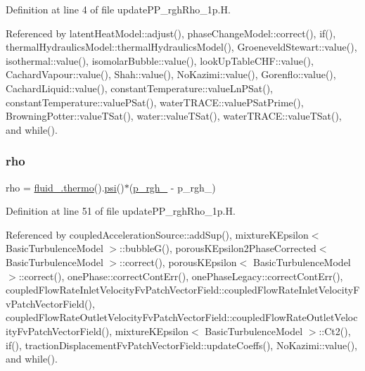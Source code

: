 Definition at line 4 of file update\+P\+P\+\_\+rgh\+Rho\+\_\+1p.\+H.



Referenced by latent\+Heat\+Model\+::adjust(), phase\+Change\+Model\+::correct(), if(), thermal\+Hydraulics\+Model\+::thermal\+Hydraulics\+Model(), Groeneveld\+Stewart\+::value(), isothermal\+::value(), isomolar\+Bubble\+::value(), look\+Up\+Table\+C\+H\+F\+::value(), Cachard\+Vapour\+::value(), Shah\+::value(), No\+Kazimi\+::value(), Gorenflo\+::value(), Cachard\+Liquid\+::value(), constant\+Temperature\+::value\+Ln\+P\+Sat(), constant\+Temperature\+::value\+P\+Sat(), water\+T\+R\+A\+C\+E\+::value\+P\+Sat\+Prime(), Browning\+Potter\+::value\+T\+Sat(), water\+::value\+T\+Sat(), water\+T\+R\+A\+C\+E\+::value\+T\+Sat(), and while().

\mbox{\label{updatePP__rghRho__1p_8H_ab8ec92cc3ea8422c9349409bae98d2a0}} 
\subsubsection{\texorpdfstring{rho}{rho}}
{\footnotesize\ttfamily rho = \hyperlink{EEqns__2p_8H_a9d615e711281a88a96c648787c7dbd32}{fluid\+\_\+.\+thermo}().\hyperlink{UEqn__1pl_8H_a165a34deec3ee505598e511a88831968}{psi}()$\ast$(\hyperlink{updatePP__rghRho__2p_8H_a320090d1a3c1675778a59e981765c77c}{p\+\_\+rgh\+\_\+} -\/ p\+\_\+rgh\+\_)}



Definition at line 51 of file update\+P\+P\+\_\+rgh\+Rho\+\_\+1p.\+H.



Referenced by coupled\+Acceleration\+Source\+::add\+Sup(), mixture\+K\+Epsilon$<$ Basic\+Turbulence\+Model $>$\+::bubble\+G(), porous\+K\+Epsilon2\+Phase\+Corrected$<$ Basic\+Turbulence\+Model $>$\+::correct(), porous\+K\+Epsilon$<$ Basic\+Turbulence\+Model $>$\+::correct(), one\+Phase\+::correct\+Cont\+Err(), one\+Phase\+Legacy\+::correct\+Cont\+Err(), coupled\+Flow\+Rate\+Inlet\+Velocity\+Fv\+Patch\+Vector\+Field\+::coupled\+Flow\+Rate\+Inlet\+Velocity\+Fv\+Patch\+Vector\+Field(), coupled\+Flow\+Rate\+Outlet\+Velocity\+Fv\+Patch\+Vector\+Field\+::coupled\+Flow\+Rate\+Outlet\+Velocity\+Fv\+Patch\+Vector\+Field(), mixture\+K\+Epsilon$<$ Basic\+Turbulence\+Model $>$\+::\+Ct2(), if(), traction\+Displacement\+Fv\+Patch\+Vector\+Field\+::update\+Coeffs(), No\+Kazimi\+::value(), and while().


